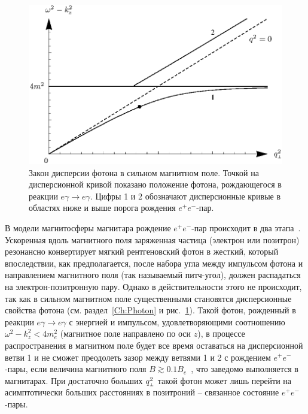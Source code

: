 %
\begin{figure}
\centerline{
\includegraphics[width=12cm]{fig5_3.eps}}
\caption{ Закон дисперсии фотона в сильном магнитном поле. 
Точкой на дисперсионной кривой 
показано положение фотона, рождающегося в реакции  $e \gamma \to e \gamma$.
 Цифры 1 и 2 обозначают дисперсионные кривые в областях ниже и выше 
порога рождения $e^+e^-$-пар.}
\label{fig:dispersion}
\end{figure}

В модели магнитосферы магнитара рождение $e^+e^-$-пар происходит в два 
этапа~\cite{Beloborodov:2007}. Ускоренная вдоль магнитного поля 
заряженная частица (электрон или позитрон)  
резонансно конвертирует мягкий рентгеновский 
фотон в жесткий, который впоследствии, как предполагается, 
после набора угла между импульсом фотона и направлением 
магнитного поля (так называемый питч-угол), 
должен распадаться на электрон-позитронную пару.  Однако в действительности этого не происходит, так как 
в сильном магнитном поле существенными становятся 
дисперсионные свойства фотона (см. раздел~\ref{Ch:Photon}  и 
рис.~\ref{fig:dispersion}). Такой фотон, рожденный 
в реакции $e\gamma \to e \gamma$ с энергией и импульсом, удовлетворяющими соотношению 
$\omega^2-k_z^2 < 4m_e^2$ (магнитное поле направлено по оси $z$), в процессе 
распространения 
в магнитном поле будет все время оставаться на дисперсионной ветви 1 и не сможет преодолеть 
зазор между ветвями 1 и 2 с рождением $e^+e^-$-пары, если 
величина магнитного поля $B \gtrsim 0.1 B_e$~\cite{Shabad:1975,ShabUsov:1982,ShabUsov:1985}, 
что заведомо выполняется в магнитарах. 
При достаточно больших $q^2_{\mbox{\tiny $\bot$}}$ 
такой фотон может лишь перейти на асимптотически больших расстояниях 
в позитроний -- связанное состояние $e^+e^-$-пары. 



